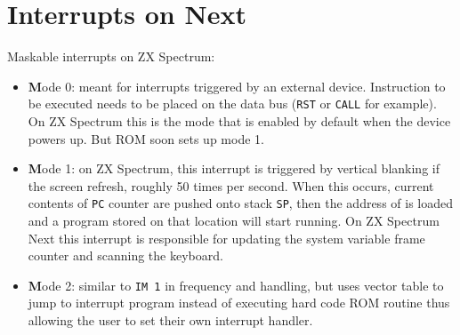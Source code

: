 \section{Interrupts on Next}
\label{zx_next_interrupts}


Maskable interrupts on ZX Spectrum:

\begin{itemize}
	\item {\textbf Mode 0}: meant for interrupts triggered by an external device. Instruction to be executed needs to be placed on the data bus ({\tt RST} or {\tt CALL} for example). On ZX Spectrum this is the mode that is enabled by default when the device powers up. But ROM soon sets up mode 1.
	
	\item {\textbf Mode 1}: on ZX Spectrum, this interrupt is triggered by vertical blanking if the screen refresh, roughly 50 times per second. When this occurs, current contents of {\tt PC} counter are pushed onto stack {\tt SP}, then the address of  is loaded and a program stored on that location will start running. On ZX Spectrum Next this interrupt is responsible for updating the system variable frame counter and scanning the keyboard.
	
	\item {\textbf Mode 2}: similar to {\tt IM 1} in frequency and handling, but uses vector table to jump to interrupt program instead of executing hard code ROM routine thus allowing the user to set their own interrupt handler.
\end{itemize}

